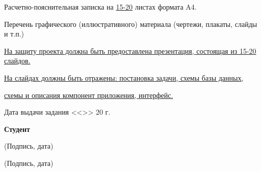 \begin{titlepage}
\begin{center}
    {\flushleft
    Расчетно-пояснительная записка на 
    \uline{\hspace{1em}15-20\hspace{1em}}
    листах формата A4.
    \hfill}

    {\flushleft
        Перечень графического (иллюстративного) материала
        (чертежи, плакаты, слайды и т.п.)
    \hfill}

    \uline{\hfill
        На защиту проекта должна быть предоставлена презентация,
        состоящая из 15-20 слайдов.
    \hfill}

    \uline{\hfill
        На слайдах должны быть отражены: постановка задачи,
        схемы базы данных,
    \hfill}

    \uline{\hfill
        схемы и описания компонент приложения, интерфейс.
    \hfill}

    \uline{\hfill\hfill}

    {\flushleft
        Дата выдачи задания <<\hspace{1.5em}>>
        \uline{\hspace{4em}} 
        20\uline{\hspace{1em}} г.
    \hfill}

\end{center}

\begin{adjustbox}{minipage=0.35\textwidth,valign=T}
    \begin{flushleft}
        \footnotesize
        \textbf{\wleadprefix}
    \end{flushleft}
        \vspace{0em}
    \begin{flushleft}
        \footnotesize
        \textbf{Студент}
    \end{flushleft}
\end{adjustbox}
\hfill
\begin{adjustbox}{minipage=0.3\linewidth,valign=T}
        \vspace{7pt}

    \begin{center}
        \footnotesize
        \uline{\hfill}

        \scriptsize
        (Подпись, дата)
    \end{center}
    \begin{center}
        \footnotesize
        \uline{\hfill}

        \scriptsize
        (Подпись, дата)
    \end{center}
\end{adjustbox}
\hfill
\begin{adjustbox}{minipage=0.3\linewidth,valign=T}
    \wauthorspace\begin{center}
        \footnotesize
        \uline{\hfill\wfirstlead\hfill}


\end{center}
\end{adjustbox}
\end{titlepage}
